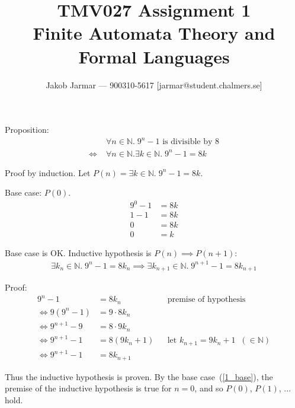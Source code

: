 \documentclass{article}
\title{TMV027 Assignment 1 \\ Finite Automata Theory and Formal Languages}
\author{Jakob Jarmar --- 900310-5617 [jarmar@student.chalmers.se]}
\date{}
\begin{document}
\maketitle

\section{}
Proposition:
\begin{equation}
\begin{split}
& \forall n \in \mathbb{N}.\; 9^n - 1 \text{ is divisible by } 8 \\
\iff \; & \forall n \in \mathbb{N} . \exists k \in \mathbb{N}.\; 9^n - 1 = 8k
\end{split}
\end{equation}

Proof by induction. Let $P(n) = \exists k \in \mathbb{N}.\; 9^n - 1 = 8k$.

Base case: $P(0)$.
\begin{equation} \label{1_base}
\begin{split}
9^0 - 1 & = 8k \\
1 - 1 & = 8k \\
0 & = 8k \\
0 & = k
\end{split}
\end{equation}

Base case is OK. Inductive hypothesis is $P(n) \implies P(n+1)$:
\begin{equation}
\begin{split}
\exists k_n \in \mathbb{N} .\; 9^n - 1 = 8k_n \implies \exists k_{n+1} \in \mathbb{N}.\; 9^{n+1} - 1 = 8k_{n+1}
\end{split}
\end{equation}

Proof:
\begin{align}
9^n - 1 & = 8k_n && \text{premise of hypothesis} \\
\iff 9(9^n - 1) & = 9 \cdot 8k_n \\
\iff 9^{n+1} - 9 & = 8 \cdot 9k_n \\
\iff 9^{n+1} - 1 & = 8(9k_n + 1) && \text{let $k_{n+1} = 9k_n+1 \;\; (\in \mathbb{N})$} \\
\iff 9^{n+1} - 1 & = 8k_{n+1}
\end{align}

Thus the inductive hypothesis is proven. By the base case~(\ref{1_base}), the premise of the inductive hypothesis is true for $n = 0$, and so $P(0)$, $P(1)$, ... hold.
\end{document}
